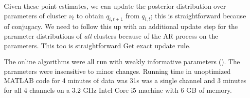 Given these point estimates, we can update the posterior distribution over parameters of cluster $\nu_t$ to obtain $q_{i,t+1}$ from $q_{i,t}$; this
is straightforward because of conjugacy. 
We need to follow this up with an additional update step for the parameter distributions of \emph{all} clusters because of the AR process on the parameters.
This too is straightforward {\color{red} Get exact update rule}.

The online algorithms were all run with weakly informative parameters (). The parameters were insensitive to minor changes.  Running time in unoptimized MATLAB code for 4 minutes of data was 31s was a single channel and 3 minutes for all 4 channels on a 3.2 GHz Intel Core i5 machine with 6 GB of memory.

